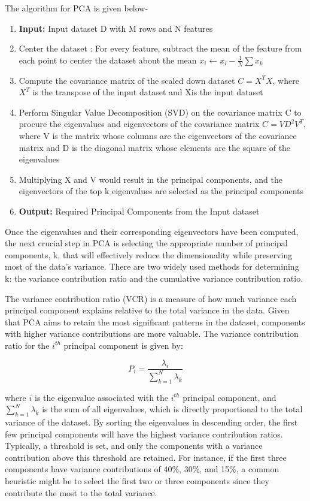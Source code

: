 The algorithm for PCA is given below-
\begin{enumerate}
	\item \textbf{Input:} Input dataset D with M rows and N features
	\item Center the dataset : For every feature, subtract the mean of the feature from each point to center the dataset about the mean
	\( x_{i} \longleftarrow x_{i} - \frac{1}{N}\sum x_{k} \)
	\item Compute the covariance matrix of the scaled down dataset
	\( C = X^{T}X \), where \( X^{T} \) is the transpose of the input dataset and Xis the input dataset
	\item Perform Singular Value Decomposition (SVD) on the covariance matrix C to procure the eigenvalues and eigenvectors of the covariance matrix \( C = VD^{2}V^{T} \), where V is the matrix whose columns are the eigenvectors of the covariance matrix and D is the diagonal matrix whose elements are the square of the eigenvalues
	\item Multiplying X and V would result in the principal components, and the eigenvectors of the top k eigenvalues are selected as the principal components
	\item \textbf{Output: } Required Principal Components from the Input dataset
\end{enumerate}

Once the eigenvalues and their corresponding eigenvectors have been computed, the next crucial step in PCA is selecting the appropriate number of principal components, k, that will effectively reduce the dimensionality while preserving most of the data's variance. There are two widely used methods for determining k: the variance contribution ratio and the cumulative variance contribution ratio\cite{pca-4}.

The variance contribution ratio (VCR) is a measure of how much variance each principal component explains relative to the total variance in the data. Given that PCA aims to retain the most significant patterns in the dataset, components with higher variance contributions are more valuable. The variance contribution ratio for the \( i^{th} \) principal component is given by:

\begin{equation}
	\label{eq:equation_1}
	P_i = \frac{\lambda_i}{\sum_{k = 1}^N\lambda_k}
\end{equation}

where \( i \) is the eigenvalue associated with the \( i^{th} \) principal component, and \( \sum_{k = 1}^N\lambda_k \) is the sum of all eigenvalues, which is directly proportional to the total variance of the dataset. By sorting the eigenvalues in descending order, the first few principal components will have the highest variance contribution ratios. Typically, a threshold is set, and only the components with a variance contribution above this threshold are retained. For instance, if the first three components have variance contributions of 40\%, 30\%, and 15\%, a common heuristic might be to select the first two or three components since they contribute the most to the total variance.

